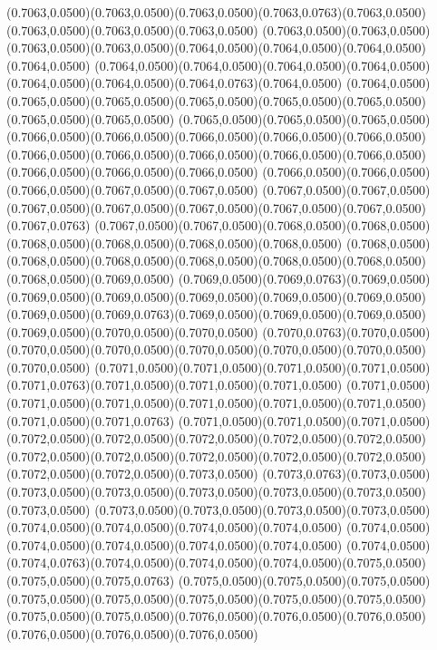 (0.7063,0.0500)(0.7063,0.0500)(0.7063,0.0500)(0.7063,0.0763)(0.7063,0.0500)(0.7063,0.0500)(0.7063,0.0500)(0.7063,0.0500)
(0.7063,0.0500)(0.7063,0.0500)(0.7063,0.0500)(0.7063,0.0500)(0.7064,0.0500)(0.7064,0.0500)(0.7064,0.0500)(0.7064,0.0500)
(0.7064,0.0500)(0.7064,0.0500)(0.7064,0.0500)(0.7064,0.0500)(0.7064,0.0500)(0.7064,0.0500)(0.7064,0.0763)(0.7064,0.0500)
(0.7064,0.0500)(0.7065,0.0500)(0.7065,0.0500)(0.7065,0.0500)(0.7065,0.0500)(0.7065,0.0500)(0.7065,0.0500)(0.7065,0.0500)
(0.7065,0.0500)(0.7065,0.0500)(0.7065,0.0500)(0.7066,0.0500)(0.7066,0.0500)(0.7066,0.0500)(0.7066,0.0500)(0.7066,0.0500)
(0.7066,0.0500)(0.7066,0.0500)(0.7066,0.0500)(0.7066,0.0500)(0.7066,0.0500)(0.7066,0.0500)(0.7066,0.0500)(0.7066,0.0500)
(0.7066,0.0500)(0.7066,0.0500)(0.7066,0.0500)(0.7067,0.0500)(0.7067,0.0500)
\PST@Solid(0.7067,0.0500)(0.7067,0.0500)(0.7067,0.0500)(0.7067,0.0500)(0.7067,0.0500)(0.7067,0.0500)(0.7067,0.0500)(0.7067,0.0763)
(0.7067,0.0500)(0.7067,0.0500)(0.7068,0.0500)(0.7068,0.0500)(0.7068,0.0500)(0.7068,0.0500)(0.7068,0.0500)(0.7068,0.0500)
(0.7068,0.0500)(0.7068,0.0500)(0.7068,0.0500)(0.7068,0.0500)(0.7068,0.0500)(0.7068,0.0500)(0.7068,0.0500)(0.7069,0.0500)
(0.7069,0.0500)(0.7069,0.0763)(0.7069,0.0500)(0.7069,0.0500)(0.7069,0.0500)(0.7069,0.0500)(0.7069,0.0500)(0.7069,0.0500)
(0.7069,0.0500)(0.7069,0.0763)(0.7069,0.0500)(0.7069,0.0500)(0.7069,0.0500)(0.7069,0.0500)(0.7070,0.0500)(0.7070,0.0500)
(0.7070,0.0763)(0.7070,0.0500)(0.7070,0.0500)(0.7070,0.0500)(0.7070,0.0500)(0.7070,0.0500)(0.7070,0.0500)(0.7070,0.0500)
(0.7071,0.0500)(0.7071,0.0500)(0.7071,0.0500)(0.7071,0.0500)(0.7071,0.0763)(0.7071,0.0500)(0.7071,0.0500)(0.7071,0.0500)
(0.7071,0.0500)(0.7071,0.0500)(0.7071,0.0500)(0.7071,0.0500)(0.7071,0.0500)(0.7071,0.0500)(0.7071,0.0500)(0.7071,0.0763)
(0.7071,0.0500)(0.7071,0.0500)(0.7071,0.0500)(0.7072,0.0500)(0.7072,0.0500)(0.7072,0.0500)(0.7072,0.0500)(0.7072,0.0500)
(0.7072,0.0500)(0.7072,0.0500)(0.7072,0.0500)(0.7072,0.0500)(0.7072,0.0500)(0.7072,0.0500)(0.7072,0.0500)(0.7073,0.0500)
(0.7073,0.0763)(0.7073,0.0500)(0.7073,0.0500)(0.7073,0.0500)(0.7073,0.0500)(0.7073,0.0500)(0.7073,0.0500)(0.7073,0.0500)
(0.7073,0.0500)(0.7073,0.0500)(0.7073,0.0500)(0.7073,0.0500)(0.7074,0.0500)(0.7074,0.0500)(0.7074,0.0500)(0.7074,0.0500)
(0.7074,0.0500)(0.7074,0.0500)(0.7074,0.0500)(0.7074,0.0500)(0.7074,0.0500)
\PST@Solid(0.7074,0.0500)(0.7074,0.0763)(0.7074,0.0500)(0.7074,0.0500)(0.7074,0.0500)(0.7075,0.0500)(0.7075,0.0500)(0.7075,0.0763)
(0.7075,0.0500)(0.7075,0.0500)(0.7075,0.0500)(0.7075,0.0500)(0.7075,0.0500)(0.7075,0.0500)(0.7075,0.0500)(0.7075,0.0500)
(0.7075,0.0500)(0.7075,0.0500)(0.7076,0.0500)(0.7076,0.0500)(0.7076,0.0500)(0.7076,0.0500)(0.7076,0.0500)(0.7076,0.0500)
